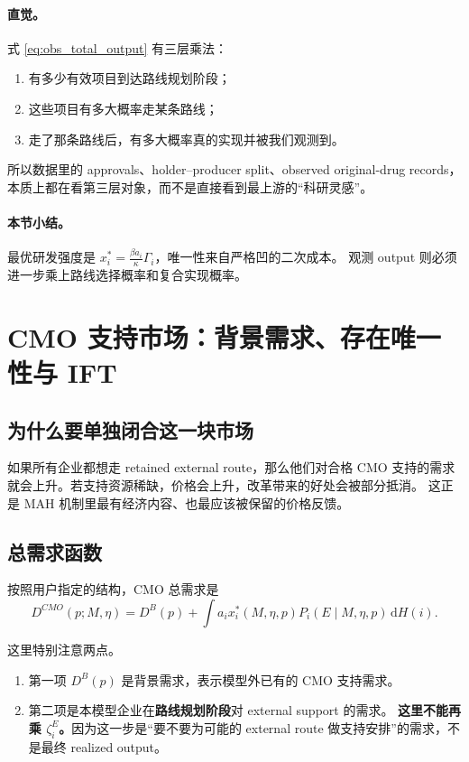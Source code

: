 \documentclass[12pt,UTF8]{ctexart}
\newcommand{\dd}{\,\mathrm{d}}
\theoremstyle{plain}
\theoremstyle{remark}
\begin{document}
\paragraph{直觉。}
式 \eqref{eq:obs_total_output} 有三层乘法：

\begin{enumerate}[leftmargin=2em]
    \item 有多少有效项目到达路线规划阶段；
    \item 这些项目有多大概率走某条路线；
    \item 走了那条路线后，有多大概率真的实现并被我们观测到。
\end{enumerate}

所以数据里的 approvals、holder--producer split、observed original-drug
records，本质上都在看第三层对象，而不是直接看到最上游的“科研灵感”。

\paragraph{本节小结。}
最优研发强度是
$x_i^*=\frac{\beta a_i}{\kappa}\Gamma_i$，唯一性来自严格凹的二次成本。
观测 output 则必须进一步乘上路线选择概率和复合实现概率。

\section{CMO 支持市场：背景需求、存在唯一性与 IFT}

\subsection{为什么要单独闭合这一块市场}

如果所有企业都想走 retained external route，那么他们对合格 CMO
支持的需求就会上升。若支持资源稀缺，价格会上升，改革带来的好处会被部分抵消。
这正是 MAH 机制里最有经济内容、也最应该被保留的价格反馈。

\subsection{总需求函数}

按照用户指定的结构，CMO 总需求是
\begin{equation}
D^{CMO}(p;M,\eta)
=
D^B(p)
+\int a_i x_i^*(M,\eta,p)P_i(E\mid M,\eta,p)\dd H(i).
\label{eq:cmo_total_demand}
\end{equation}

这里特别注意两点。

\begin{enumerate}[leftmargin=2em]
    \item 第一项 $D^B(p)$ 是背景需求，表示模型外已有的 CMO 支持需求。
    \item 第二项是本模型企业在\textbf{路线规划阶段}对 external support 的需求。
    \textbf{这里不能再乘 $\zeta_i^E$。}因为这一步是“要不要为可能的
    external route 做支持安排”的需求，不是最终 realized output。
\end{enumerate}
\end{document}
